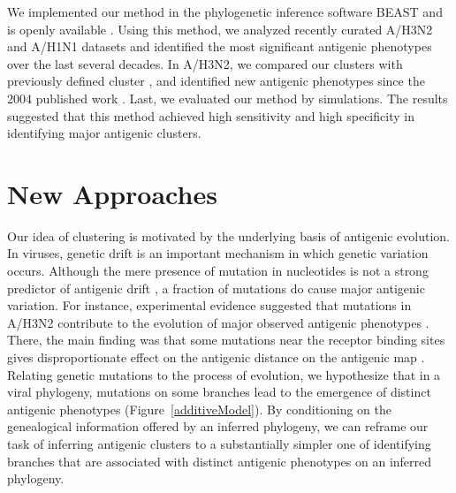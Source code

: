 \documentclass[11pt,oneside,letterpaper]{article}
\begin{document}
We implemented our method in the phylogenetic inference software BEAST and is openly available \cite{BEAST17}.
Using this method, we analyzed recently curated A/H3N2 and A/H1N1 datasets and identified the most significant antigenic phenotypes over the last several decades. 
In A/H3N2, we compared our clusters with previously defined cluster \cite{smith_mapping_2004}, and identified new antigenic phenotypes since the 2004 published work \cite{smith_mapping_2004}. 
Last, we evaluated our method by simulations.
The results suggested that this method achieved high sensitivity and high specificity in identifying major antigenic clusters.



\newpage

\section*{New Approaches}

Our idea of clustering is motivated by the underlying basis of antigenic evolution.  
In viruses, genetic drift is an important mechanism in which genetic variation occurs. 
Although the mere presence of mutation in nucleotides is not a strong predictor of antigenic drift \cite{smith_mapping_2004}, a fraction of mutations do cause major antigenic variation. 
For instance, experimental evidence suggested that mutations in A/H3N2 contribute to the evolution of major observed antigenic phenotypes \cite{koel_substitutions_2013}.
There, the main finding was that some mutations near the receptor binding sites gives disproportionate effect on the antigenic distance on the antigenic map \cite{koel_substitutions_2013}. 
Relating genetic mutations to the process of evolution, we hypothesize that in a viral phylogeny, mutations on some branches lead to the emergence of distinct antigenic phenotypes (Figure~\ref{additiveModel}).  
By conditioning on the genealogical information offered by an inferred phylogeny, we can reframe our task of inferring antigenic clusters to a substantially simpler one of identifying branches that are associated with distinct antigenic phenotypes on an inferred phylogeny.
	
\end{document}

